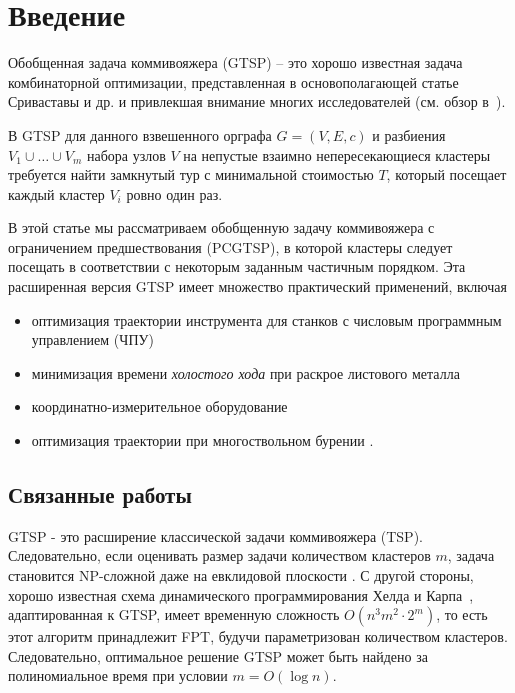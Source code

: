 \section{Введение}\label{sec:intro}
Обобщенная задача коммивояжера (GTSP) -- 
это хорошо известная задача комбинаторной оптимизации, 
представленная в основополагающей статье \cite{SKGS1969} 
Сриваставы и др. и привлекшая внимание многих исследователей
(см. обзор в~\cite{GutinPunnen2007}).

В GTSP для данного взвешенного орграфа 
$ G = (V, E, c) $ 
и разбиения $ V_1 \cup \ldots \cup V_m $ набора узлов $ V $ 
на непустые взаимно непересекающиеся кластеры требуется найти замкнутый тур с минимальной стоимостью $ T $, 
который посещает каждый кластер $ V_i $ ровно один раз.

В этой статье мы рассматриваем обобщенную задачу коммивояжера 
с ограничением предшествования (PCGTSP), 
в которой кластеры следует посещать в соответствии с некоторым заданным частичным порядком. 
Эта расширенная версия GTSP имеет множество практический применений, включая
\begin{itemize}
	\item
	оптимизация траектории инструмента для станков с числовым программным управлением (ЧПУ) 
	\cite{CASTELINO2003173}
	\item
	минимизация времени {\it холостого хода} при раскрое листового металла 
	\cite{Petunin2018, Makarovskikh20181171}
	\item
	координатно-измерительное оборудование 
	\cite{SALMAN2016138} 
	\item
	оптимизация траектории при многоствольном бурении
	\cite{DEWIL2019}.
\end{itemize}

\subsection{Связанные работы} 
GTSP - это расширение классической задачи коммивояжера (TSP). 
Следовательно, если оценивать размер задачи количеством кластеров 
$ m $, 
задача становится NP-сложной даже на евклидовой плоскости \cite{Papa77}. 
С другой стороны, 
хорошо известная схема динамического программирования Хелда и Карпа~\cite{HeldKarp1962}, 
адаптированная к GTSP, 
имеет временную сложность 
$ O (n ^ 3m ^ 2 \cdot 2 ^ m) $, 
то есть этот алгоритм принадлежит FPT,
будучи параметризован количеством кластеров. 
Следовательно, 
оптимальное решение
GTSP может быть найдено за полиномиальное время при условии 
$ m = O (\log n) $.

